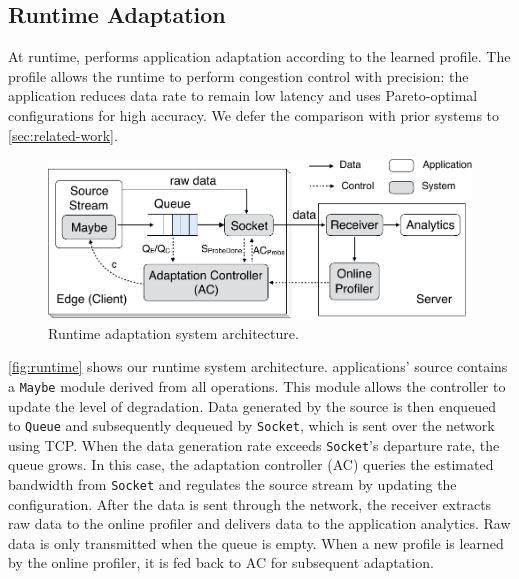 \subsection{Runtime Adaptation}
\label{sec:runtime}

At runtime, \sysname{} performs application adaptation according to the learned
profile. The profile allows the runtime to perform congestion control with
precision: the application reduces data rate to remain low latency and uses
Pareto-optimal configurations for high accuracy. We defer the comparison with
prior systems to \autoref{sec:related-work}.

\begin{figure}
  \centering
  \includegraphics[width=\linewidth]{figures/runtime-adaptation.pdf}
  \caption{Runtime adaptation system architecture.}
  \label{fig:runtime}
\end{figure}

\autoref{fig:runtime} shows our runtime system architecture. \sysname{}
applications' source contains a \texttt{Maybe} module derived from all \maybe{}
operations. This module allows the controller to update the level of
degradation. Data generated by the source is then enqueued to \texttt{Queue} and
subsequently dequeued by \texttt{Socket}, which is sent over the network using
TCP. When the data generation rate exceeds \texttt{Socket}'s departure rate, the
queue grows. In this case, the adaptation controller (AC) queries the estimated
bandwidth from \texttt{Socket} and regulates the source stream by updating the
configuration.  After the data is sent through the network, the receiver
extracts raw data to the online profiler and delivers data to the application
analytics. Raw data is only transmitted when the queue is empty. When a new
profile is learned by the online profiler, it is fed back to AC for subsequent
adaptation.

